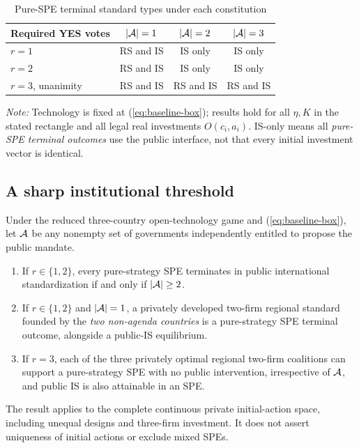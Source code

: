 \begin{table}[ht]
\centering
\caption{Pure-SPE terminal standard types under each constitution}
\label{tab:constitution}
\small
\begin{tabular}{@{}lccc@{}}
\toprule
Required YES votes & \(|\mathcal{A}|=1\) & \(|\mathcal{A}|=2\) & \(|\mathcal{A}|=3\)\\
\midrule
\(r=1\) & RS and IS & IS only & IS only\\
\(r=2\) & RS and IS & IS only & IS only\\
\(r=3\), unanimity & RS and IS & RS and IS & RS and IS\\
\bottomrule
\end{tabular}
\vspace{2mm}
\begin{minipage}{.94\linewidth}\footnotesize
\textit{Note:} Technology is fixed at (\ref{eq:baseline-box}); results hold for all \(\eta,K\) in the stated rectangle and all legal real investments \(O(c_i,a_i)\). IS-only means all \emph{pure-SPE terminal outcomes} use the public interface, not that every initial investment vector is identical.
\end{minipage}
\end{table}

\subsection{A sharp institutional threshold}\label{subsec:main-constitutional}

\begin{proposition}
\label{prop:agenda}
Under the reduced three-country open-technology game and
(\ref{eq:baseline-box}), let \(\mathcal{A}\) be any nonempty set of governments
independently entitled to propose the public mandate.
\begin{enumerate}
\item If \(r\in\{1,2\}\), every pure-strategy SPE terminates in public
      international standardization if and only if \(|\mathcal{A}|\ge2\).
\item If \(r\in\{1,2\}\) and \(|\mathcal{A}|=1\), a privately developed
      two-firm regional standard founded by the \emph{two non-agenda
      countries} is a pure-strategy SPE terminal outcome, alongside a
      public-IS equilibrium.
\item If \(r=3\), each of the three privately optimal regional
      two-firm coalitions can support a pure-strategy SPE with no
      public intervention, irrespective of \(\mathcal{A}\), and public IS
      is also attainable in an SPE.
\end{enumerate}
The result applies to the complete continuous private initial-action
space, including unequal designs and three-firm investment. It
does not assert uniqueness of initial actions or exclude mixed SPEs.
\end{proposition}

